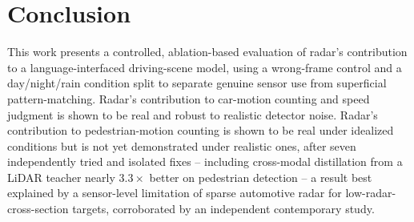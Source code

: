 \documentclass[conference]{IEEEtran}
\begin{document}
\section{Conclusion}
This work presents a controlled, ablation-based evaluation of radar's contribution to a language-interfaced
driving-scene model, using a wrong-frame control and a day/night/rain condition split to separate genuine sensor
use from superficial pattern-matching. Radar's contribution to car-motion counting and speed judgment is shown to
be real and robust to realistic detector noise. Radar's contribution to pedestrian-motion counting is shown to be
real under idealized conditions but is not yet demonstrated under realistic ones, after seven independently tried
and isolated fixes -- including cross-modal distillation from a LiDAR teacher nearly $3.3\times$ better on
pedestrian detection -- a result best explained by a sensor-level limitation of sparse automotive radar for
low-radar-cross-section targets, corroborated by an independent contemporary study.
\end{document}
